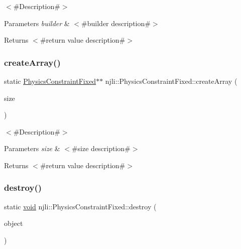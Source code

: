 $<$\#\+Description\#$>$


\begin{DoxyParams}{Parameters}
{\em builder} & $<$\#builder description\#$>$\\
\hline
\end{DoxyParams}
\begin{DoxyReturn}{Returns}
$<$\#return value description\#$>$ 
\end{DoxyReturn}
\mbox{\label{classnjli_1_1_physics_constraint_fixed_ab81f24e0e128e347f7fa152d54877803}} 
\subsubsection{\texorpdfstring{create\+Array()}{createArray()}}
{\footnotesize\ttfamily static \mbox{\hyperlink{classnjli_1_1_physics_constraint_fixed}{Physics\+Constraint\+Fixed}}$\ast$$\ast$ njli\+::\+Physics\+Constraint\+Fixed\+::create\+Array (\begin{DoxyParamCaption}\item[{const \mbox{\hyperlink{_util_8h_a10e94b422ef0c20dcdec20d31a1f5049}{u32}}}]{size }\end{DoxyParamCaption})\hspace{0.3cm}{\ttfamily [static]}}

$<$\#\+Description\#$>$


\begin{DoxyParams}{Parameters}
{\em size} & $<$\#size description\#$>$\\
\hline
\end{DoxyParams}
\begin{DoxyReturn}{Returns}
$<$\#return value description\#$>$ 
\end{DoxyReturn}
\mbox{\label{classnjli_1_1_physics_constraint_fixed_a2c2cceb0946d76136247a9b5bc2ce850}} 
\subsubsection{\texorpdfstring{destroy()}{destroy()}}
{\footnotesize\ttfamily static \mbox{\hyperlink{_thread_8h_af1e856da2e658414cb2456cb6f7ebc66}{void}} njli\+::\+Physics\+Constraint\+Fixed\+::destroy (\begin{DoxyParamCaption}\item[{\mbox{\hyperlink{classnjli_1_1_physics_constraint_fixed}{Physics\+Constraint\+Fixed}} $\ast$}]{object }\end{DoxyParamCaption})\hspace{0.3cm}{\ttfamily [static]}}

